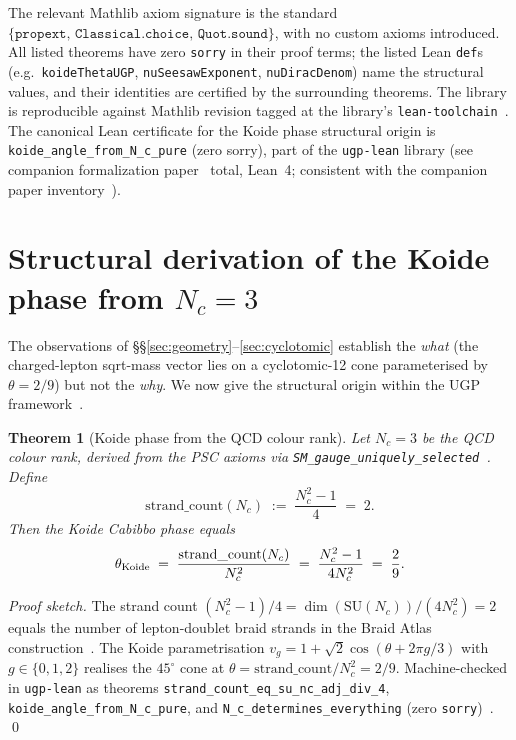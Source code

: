 \documentclass[11pt]{article}
\newtheorem{theorem}{Theorem}[section]
\theoremstyle{remark}
\begin{document}
\begin{sloppypar}
The relevant Mathlib axiom signature is the standard $\{\texttt{propext},\allowbreak\,\texttt{Classical.choice},\allowbreak\,\texttt{Quot.sound}\}$, with no custom axioms introduced.  All listed theorems have zero \texttt{sorry} in their proof terms; the listed Lean \texttt{def}s (e.g.\ \texttt{koideThetaUGP}, \texttt{nuSeesawExponent}, \texttt{nuDiracDenom}) name the structural values, and their identities are certified by the surrounding theorems.  The library is reproducible against Mathlib revision tagged at the library's \texttt{lean-toolchain}~\cite{ugp-lean}.
The canonical Lean certificate for the Koide phase structural origin is \texttt{koide\_angle\_from\_N\_c\_pure} (zero sorry), part of the \texttt{ugp-lean} library (see companion formalization paper~\cite{SpivackUGPFormalization} total, Lean~4; consistent with the companion paper inventory~\cite{Spivack2026_SM_UGP}).
\end{sloppypar}

\section{Structural derivation of the Koide phase from $N_c = 3$}
\label{sec:nc_origin}

The observations of \S\S\ref{sec:geometry}--\ref{sec:cyclotomic} establish the \emph{what} (the charged-lepton sqrt-mass vector lies on a cyclotomic-12 cone parameterised by $\theta = 2/9$) but not the \emph{why}.  We now give the structural origin within the UGP framework~\cite{Spivack2026_SM_UGP}.

\begin{theorem}[Koide phase from the QCD colour rank]
\label{thm:nc_koide}
Let $N_c = 3$ be the QCD colour rank, derived from the PSC axioms via \texttt{SM\_gauge\_uniquely\_selected}~\cite{ugp-lean}.  Define
\[
\mathrm{strand\_count}(N_c) \;:=\; \frac{N_c^2 - 1}{4} \;=\; 2.
\]
Then the Koide Cabibbo phase equals
\[
\theta_{\rm Koide} \;=\; \frac{\mathrm{strand\_count}(N_c)}{N_c^2} \;=\; \frac{N_c^2 - 1}{4N_c^2} \;=\; \frac{2}{9}.
\]
\end{theorem}

\noindent\emph{Proof sketch.}  The strand count $(N_c^2-1)/4 = \dim(\mathrm{SU}(N_c))/(4N_c^2) = 2$ equals the number of lepton-doublet braid strands in the Braid Atlas construction~\cite{Spivack2026_SM_UGP}.  The Koide parametrisation $v_g = 1 + \sqrt{2}\cos(\theta + 2\pi g/3)$ with $g \in \{0,1,2\}$ realises the $45^\circ$ cone at $\theta = \mathrm{strand\_count}/N_c^2 = 2/9$.  Machine-checked in \texttt{ugp-lean} as theorems \nolinkurl{strand_count_eq_su_nc_adj_div_4}, \nolinkurl{koide_angle_from_N_c_pure}, and \nolinkurl{N_c_determines_everything} (zero \texttt{sorry})~\cite{ugp-lean}. \qed
\end{document}
